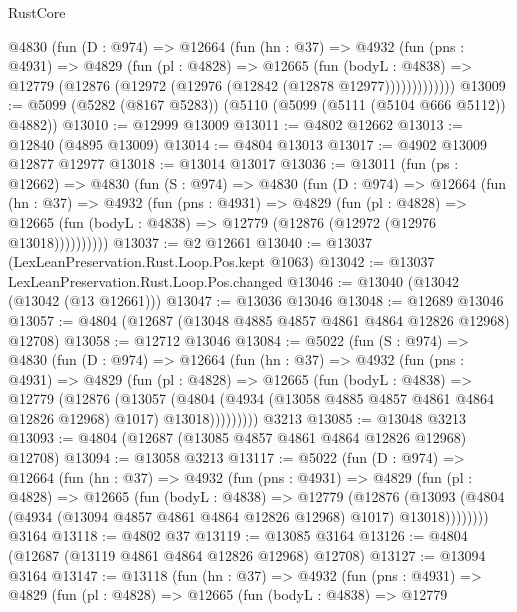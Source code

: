 \begin{lexlean}{RustCore}
\begin{coremodule}
        @4830
          (fun (D : @974) =>
          @12664
            (fun (hn : @37) =>
            @4932
              (fun (pns : @4931) =>
              @4829
                (fun (pl : @4828) =>
                @12665
                  (fun (bodyL : @4838) =>
                  @12779 (@12876 (@12972 (@12976 (@12842 (@12878 @12977)))))))))))))
@13009 := @5099 (@5282 (@8167 @5283)) (@5110 (@5099 (@5111 (@5104 @666 @5112)) @4882))
@13010 := @12999 @13009
@13011 := @4802 @12662
@13013 := @12840 (@4895 @13009)
@13014 := @4804 @13013
@13017 := @4902 @13009 @12877 @12977
@13018 := @13014 @13017
@13036 := @13011
    (fun (ps : @12662) =>
    @4830
      (fun (S : @974) =>
      @4830
        (fun (D : @974) =>
        @12664
          (fun (hn : @37) =>
          @4932
            (fun (pns : @4931) =>
            @4829
              (fun (pl : @4828) =>
              @12665 (fun (bodyL : @4838) => @12779 (@12876 (@12972 (@12976 @13018))))))))))
@13037 := @2 @12661
@13040 := @13037 (LexLeanPreservation.Rust.Loop.Pos.kept @1063)
@13042 := @13037 LexLeanPreservation.Rust.Loop.Pos.changed
@13046 := @13040 (@13042 (@13042 (@13 @12661)))
@13047 := @13036 @13046
@13048 := @12689 @13046
@13057 := @4804 (@12687 (@13048 @4885 @4857 @4861 @4864 @12826 @12968) @12708)
@13058 := @12712 @13046
@13084 := @5022
    (fun (S : @974) =>
    @4830
      (fun (D : @974) =>
      @12664
        (fun (hn : @37) =>
        @4932
          (fun (pns : @4931) =>
          @4829
            (fun (pl : @4828) =>
            @12665
              (fun (bodyL : @4838) =>
              @12779
                (@12876
                  (@13057
                    (@4804
                      (@4934 (@13058 @4885 @4857 @4861 @4864 @12826 @12968) @1017)
                      @13018)))))))))
    @3213
@13085 := @13048 @3213
@13093 := @4804 (@12687 (@13085 @4857 @4861 @4864 @12826 @12968) @12708)
@13094 := @13058 @3213
@13117 := @5022
    (fun (D : @974) =>
    @12664
      (fun (hn : @37) =>
      @4932
        (fun (pns : @4931) =>
        @4829
          (fun (pl : @4828) =>
          @12665
            (fun (bodyL : @4838) =>
            @12779
              (@12876
                (@13093 (@4804 (@4934 (@13094 @4857 @4861 @4864 @12826 @12968) @1017) @13018))))))))
    @3164
@13118 := @4802 @37
@13119 := @13085 @3164
@13126 := @4804 (@12687 (@13119 @4861 @4864 @12826 @12968) @12708)
@13127 := @13094 @3164
@13147 := @13118
    (fun (hn : @37) =>
    @4932
      (fun (pns : @4931) =>
      @4829
        (fun (pl : @4828) =>
        @12665
          (fun (bodyL : @4838) =>
          @12779

\end{coremodule}
\end{lexlean}

